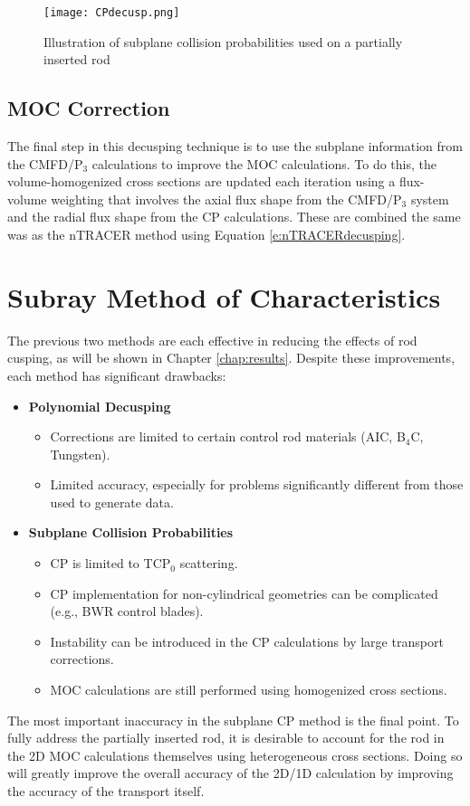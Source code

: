 \begin{figure}
    \centering
    \texttt{[image: CPdecusp.png]}
    \caption{Illustration of subplane collision probabilities used on a partially inserted rod}\label{f:SCPdecusping}
\end{figure}

\subsection{MOC Correction}

The final step in this decusping technique is to use the subplane information from the CMFD/P$_3$ calculations to improve the MOC calculations.  To do this, the volume-homogenized cross sections are updated each iteration using a flux-volume weighting that involves the axial flux shape from the CMFD/P$_3$ system and the radial flux shape from the CP calculations.  These are combined the same was as the nTRACER method using Equation \ref{e:nTRACERdecusping}.

\section{Subray Method of Characteristics}

The previous two methods are each effective in reducing the effects of rod cusping, as will be shown in Chapter \ref{chap:results}.  Despite these improvements, each method has significant drawbacks:
\begin{itemize}[leftmargin=*]
    \item \textbf{Polynomial Decusping}
    
    \begin{itemize}
        \item Corrections are limited to certain control rod materials (AIC, B$_4$C, Tungsten).
        \item Limited accuracy, especially for problems significantly different from those used to generate data.
    \end{itemize}

    \item \textbf{Subplane Collision Probabilities}
    
    \begin{itemize}
        \item CP is limited to TCP$_0$ scattering.
        \item CP implementation for non-cylindrical geometries can be complicated (e.g., BWR control blades).
        \item Instability can be introduced in the CP calculations by large transport corrections.
        \item MOC calculations are still performed using homogenized cross sections.
    \end{itemize}
\end{itemize}
The most important inaccuracy in the subplane CP method is the final point.  To fully address the partially inserted rod, it is desirable to account for the rod in the 2D MOC calculations themselves using heterogeneous cross sections.  Doing so will greatly improve the overall accuracy of the 2D/1D calculation by improving the accuracy of the transport itself.


